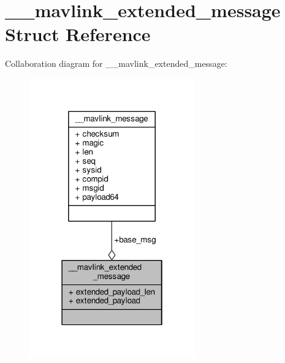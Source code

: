 \hypertarget{struct____mavlink__extended__message}{\section{\+\_\+\+\_\+mavlink\+\_\+extended\+\_\+message Struct Reference}
\label{struct____mavlink__extended__message}
}


Collaboration diagram for \+\_\+\+\_\+mavlink\+\_\+extended\+\_\+message\+:
\nopagebreak
\begin{figure}[H]
\begin{center}
\leavevmode
\includegraphics[width=202pt]{struct____mavlink__extended__message__coll__graph}
\end{center}
\end{figure}
